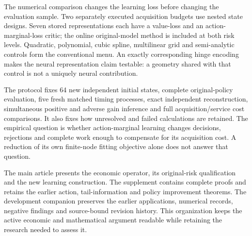 The numerical comparison changes the learning loss before changing the
evaluation sample. Two separately executed acquisition budgets use nested
state designs. Seven stored representations each have a value-loss and an
action-marginal-loss critic; the online original-model method is included at
both risk levels. Quadratic, polynomial, cubic spline, multilinear grid and
semi-analytic controls form the conventional menu. An exactly corresponding
hinge encoding makes the neural representation claim testable: a geometry
shared with that control is not a uniquely neural contribution.

The protocol fixes 64 new independent initial states, complete original-policy
evaluation, five fresh matched timing processes, exact independent
reconstruction, simultaneous positive and adverse gain inference and full
acquisition/service cost comparisons. It also fixes how unresolved and failed
calculations are retained. The empirical question is whether action-marginal
learning changes decisions, rejections and complete work enough to compensate
for its acquisition cost. A reduction of its own finite-node fitting objective
alone does not answer that question.

The main article presents the economic operator, its original-risk
qualification and the new learning construction. The supplement contains
complete proofs and retains the earlier action, tail-information and policy
improvement theorems. The development companion preserves the earlier
applications, numerical records, negative findings and source-bound revision
history. This organization keeps the active economic and mathematical
argument readable while retaining the research needed to assess it.
